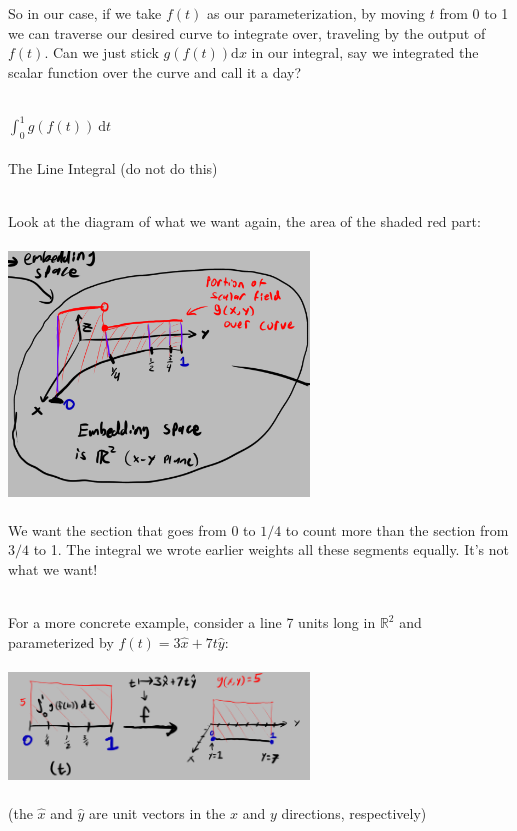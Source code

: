 \documentclass{article}
\newcommand{\hcm}[1][1]{\hspace{#1 cm}}
\newcommand{\R}{\mathbb{R}}
\newcommand{\ch}[1]{\text{#1}}
\newcommand{\dspt}{\displaystyle}
\begin{document}
\begin{flushleft}
{So in our case, if we take $f(t)$ as our parameterization, by moving $t$ from 0 to 1 we can traverse our desired curve to integrate over, traveling by the output of $f(t)$. Can we just stick $g(f(t)) \ch{d}x$ in our integral, say we integrated the scalar function over the curve and call it a day?\\\ \\
\begin{center}$\dspt \int_0^1 g(f(t))\ \ch{d}t$\\\ \\The Line Integral (do not do this)\\\ \\\end{center}
Look at the diagram of what we want again, the area of the shaded red part:\\\ \\
\hcm[2] \includegraphics[width=8cm]{form}\\\ \\
We want the section that goes from 0 to $1/4$ to count more than the section from $3/4$ to 1. The integral we wrote earlier weights all these segments equally. It's not what we want!\\\ 

For a more concrete example, consider a line 7 units long in $\R^2$ and parameterized by $f(t) = 3\hat{x} + 7t \hat{y}$:\\\ \\
\hcm[2] \includegraphics[width=8cm]{sim}\\\ \\
\hcm[1](the $\hat{x}$ and $\hat{y}$ are unit vectors in the $x$ and $y$ directions, respectively)\\\ 

}
\end{flushleft}
\end{document}
